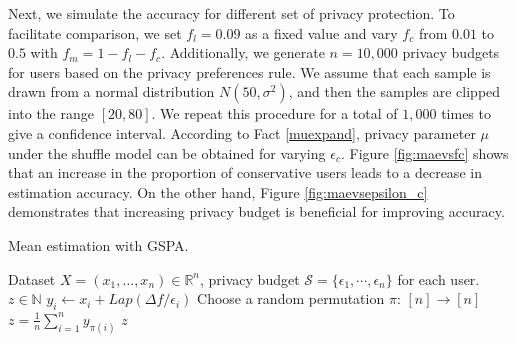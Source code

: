 \documentclass[letterpaper]{article} %
\begin{document}
Next, we simulate the accuracy for different set of privacy protection. To facilitate comparison, we set $f_l=0.09$ as a fixed value and vary $f_c$ from $0.01$ to $0.5$ with $f_m=1-f_l-f_c$. Additionally, we generate $n=10,000$ privacy budgets for users based on the privacy preferences rule.
We assume that each sample is drawn from a normal distribution $N(50,\sigma^2)$, and then the samples are clipped into the range $[20, 80]$. We repeat this procedure for a total of $1,000$ times to give a confidence interval.
According to Fact \ref{muexpand}, privacy parameter $\mu$ under the shuffle model can be obtained for varying $\epsilon_c$.
Figure \ref{fig:maevsfc} shows that an increase in the proportion of conservative users leads to a decrease in estimation accuracy. On the other hand, Figure \ref{fig:maevsepsilon_c} demonstrates that increasing privacy budget is beneficial for improving accuracy.
\begin{algorithm}[htbp]
     \caption{Mean estimation with GSPA.}
    \label{alg:LapSum}
    \renewcommand{\algorithmicrequire}{\textbf{Input:}}
    \renewcommand{\algorithmicensure}{\textbf{Output:}}
    \begin{algorithmic}[1]
        \REQUIRE Dataset $X = (x_1,\ldots,x_n)\in \mathbb{R}^n$, privacy budget $\mathcal{S} = \{\epsilon_1, \cdots, \epsilon_n\}$ for each user.
        \ENSURE $z \in \mathbb{N}$   %
        \STATE $y_i \leftarrow x_i+Lap(\Delta f/\epsilon_i)$
        \ENDFOR
        \STATE Choose a random permutation $\pi$: $[n] \rightarrow [n]$
        \STATE $z =\frac{1}{n} \sum_{i=1}^n y_{\pi(i)}$
        \RETURN $z$
    \end{algorithmic}
\end{algorithm}

%
\end{document}
